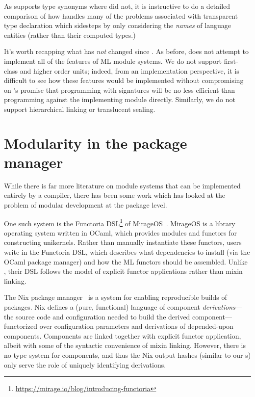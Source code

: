 As \Backpack{} supports type synonyms where \OldBackpack{} did not,
it is instructive to do a detailed comparison of how \Backpack{} handles
many of the problems associated with transparent type declaration
which \OldBackpack{} sidesteps by only considering the \emph{names}
of language entities (rather than their computed types.)

It's worth recapping what has \emph{not} changed since \OldBackpack{}.
As before, \Backpack{} does not attempt to implement all of the features
of ML module systems.  We do not support first-class and higher order
units; indeed, from an implementation perspective, it is difficult to
see how these features would be implemented without compromising on
\Backpack{}'s promise that programming with signatures will be no less
efficient than programming against the implementing module directly.
Similarly, we do not support hierarchical linking or translucent
sealing.

\section{Modularity in the package manager}

While there is far more
literature on module systems that can be implemented entirely by a
compiler, there has been some work which has looked at the problem of
modular development at the package level.

One such system
is the Functoria DSL\footnote{\smaller\url{https://mirage.io/blog/introducing-functoria}}
of MirageOS~\cite{mirageos}.  MirageOS is a library operating system
written in OCaml, which provides modules and functors for constructing
unikernels.  Rather than manually instantiate these functors,
users write in the Functoria DSL, which describes what
dependencies to install (via the OCaml package manager) and how the ML
functors should be assembled.  Unlike \Backpack{}, their DSL follows
the model of explicit functor applications rather than mixin linking.

The Nix package manager~\cite{dolstra:thesis} is a
system for enabling reproducible builds of packages. Nix defines a (pure, functional) language of component
\emph{derivations}---\ie{} the source code and configuration
needed to build the derived component---%
functorized over configuration parameters and derivations of
depended-upon components.  Components are linked together with explicit
functor application, albeit with some of the syntactic convenience of
mixin linking.  However, there is no type system for components,
and thus the Nix output hashes (similar to our \cid{}s) only serve
the role of uniquely identifying derivations.


